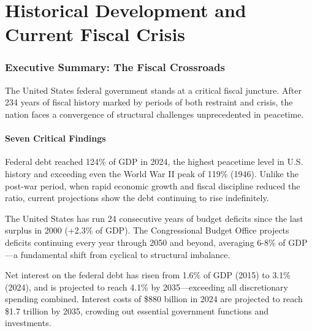 \documentclass[12pt,letterpaper]{article}
\begin{document}
\newpage
\tableofcontents
\newpage


\part{Historical Development and Current Fiscal Crisis}

\section{Executive Summary: The Fiscal Crossroads}

The United States federal government stands at a critical fiscal juncture. After 234 years of fiscal history marked by periods of both restraint and crisis, the nation faces a convergence of structural challenges unprecedented in peacetime.

\subsection{Seven Critical Findings}

\begin{tcolorbox}[colback=lightblue,colframe=darkblue,title=\textbf{Finding \#1: Debt at World War II Levels}]
Federal debt reached 124\% of GDP in 2024, the highest peacetime level in U.S. history and exceeding even the World War II peak of 119\% (1946). Unlike the post-war period, when rapid economic growth and fiscal discipline reduced the ratio, current projections show the debt continuing to rise indefinitely.
\end{tcolorbox}

\begin{tcolorbox}[colback=lightblue,colframe=darkblue,title=\textbf{Finding \#2: Structural Deficits Have Become Permanent}]
The United States has run 24 consecutive years of budget deficits since the last surplus in 2000 (+2.3\% of GDP). The Congressional Budget Office projects deficits continuing every year through 2050 and beyond, averaging 6-8\% of GDP—a fundamental shift from cyclical to structural imbalance.
\end{tcolorbox}

\begin{tcolorbox}[colback=lightblue,colframe=darkblue,title=\textbf{Finding \#3: Interest Payments Approaching Crisis Levels}]
Net interest on the federal debt has risen from 1.6\% of GDP (2015) to 3.1\% (2024), and is projected to reach 4.1\% by 2035—exceeding all discretionary spending combined. Interest costs of \$880 billion in 2024 are projected to reach \$1.7 trillion by 2035, crowding out essential government functions and investments.
\end{tcolorbox}
\end{document}
